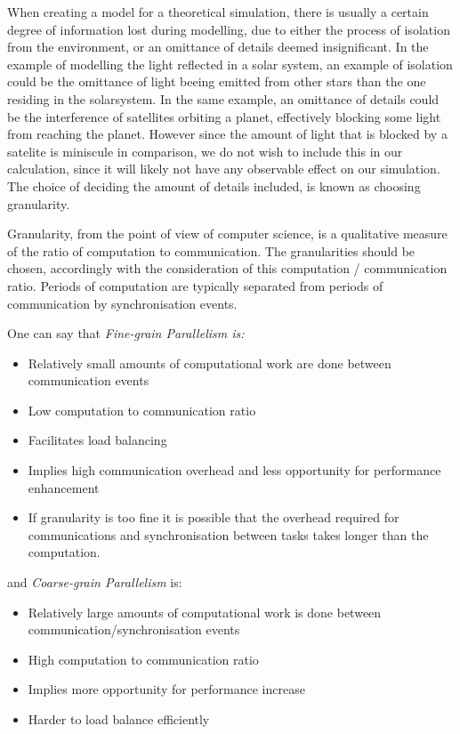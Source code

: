 When creating a model for a theoretical simulation, there is usually a certain degree of information lost during modelling, due to either the process of isolation from the environment, or an omittance of details deemed insignificant. In the example of modelling the light reflected in a solar system, an example of isolation could be the omittance of light beeing emitted from other stars than the one residing in the solarsystem. In the same example, an omittance of details could be the interference of satellites orbiting a planet, effectively blocking some light from reaching the planet. However since the amount of light that is blocked by a satelite is miniscule in comparison, we do not wish to include this in our calculation, since it will likely not have any observable effect on our simulation. The choice of deciding the amount of details included, is known as choosing granularity.

Granularity, from the point of view of computer science, is a qualitative measure of the ratio of computation to communication. The granularities should be chosen, accordingly with the consideration of this computation / communication ratio. Periods of computation are typically separated from periods of communication by synchronisation events.

One can say that \emph{Fine-grain Parallelism is:}

\begin{itemize}
\item Relatively small amounts of computational work are done between communication events
\item Low computation to communication ratio
\item Facilitates load balancing
\item Implies high communication overhead and less opportunity for performance enhancement
\item If granularity is too fine it is possible that the overhead required for communications and synchronisation between tasks takes longer than the computation.
\end{itemize}

and \emph{Coarse-grain Parallelism} is:

\begin{itemize}
\item Relatively large amounts of computational work is done between communication/synchronisation events
\item High computation to communication ratio
\item Implies more opportunity for performance increase
\item Harder to load balance efficiently
\end{itemize}

